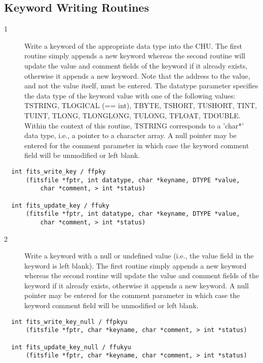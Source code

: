 \documentclass[11pt]{book}
\begin{document}
\subsection{Keyword Writing Routines}


\begin{description}
\item[1 ] Write a keyword of the appropriate data type into the
    CHU.  The first routine simply appends a new keyword whereas the
    second routine will update the value and comment fields of the
    keyword if it already exists, otherwise it appends a new
    keyword.  Note that the address to the value, and not the value
    itself, must be entered.    The datatype parameter specifies the
    data type of the keyword value with one of the following values:
    TSTRING, TLOGICAL (== int), TBYTE, TSHORT, TUSHORT, TINT, TUINT,
    TLONG, TLONGLONG, TULONG, TFLOAT, TDOUBLE.  Within the context of this
    routine, TSTRING corresponds to a 'char*' data type, i.e., a pointer
    to a character array.  A null pointer may be entered for the
    comment parameter in which case the  keyword comment
   field will be unmodified or left blank.  \label{ffpky} \label{ffuky}
\end{description}

\begin{verbatim}
  int fits_write_key / ffpky
      (fitsfile *fptr, int datatype, char *keyname, DTYPE *value,
          char *comment, > int *status)

  int fits_update_key / ffuky
      (fitsfile *fptr, int datatype, char *keyname, DTYPE *value,
          char *comment, > int *status)
\end{verbatim}

\begin{description}
\item[2 ] Write a keyword with a null or undefined value (i.e., the
    value field in the keyword is left blank).  The first routine
    simply appends a new keyword whereas the second routine will update
    the value and comment fields of the keyword if it already exists,
    otherwise it appends a new keyword.  A null pointer may be
    entered for the comment parameter in which case the  keyword
    comment
   field will be unmodified or left blank. \label{ffpkyu} \label{ffukyu}
\end{description}

\begin{verbatim}
  int fits_write_key_null / ffpkyu
      (fitsfile *fptr, char *keyname, char *comment, > int *status)

  int fits_update_key_null / ffukyu
      (fitsfile *fptr, char *keyname, char *comment, > int *status)
\end{verbatim}
\end{document}
